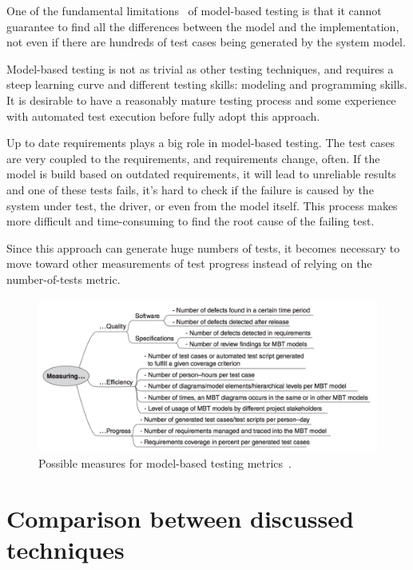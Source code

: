 One of the fundamental limitations~\cite{1200168} of model-based testing is that it cannot guarantee to find all the differences between the model and the implementation, not even if there are hundreds of test cases being generated by the system model.

Model-based testing is not as trivial as other testing techniques, and requires a steep learning curve and different testing skills: modeling and programming skills. It is desirable to have a reasonably mature testing process and some experience with automated test execution before fully adopt this approach.

Up to date requirements plays a big role in model-based testing. The test cases are very coupled to the requirements, and requirements change, often. If the model is build based on outdated requirements, it will lead to unreliable results and one of these tests fails, it's hard to check if the failure is caused by the system under test, the driver, or even from the model itself. This process makes more difficult and time-consuming to find the root cause of the failing test.

\newpage
Since this approach can generate huge numbers of tests, it becomes necessary to move toward other measurements of test progress instead of relying on the number-of-tests metric.

\begin{figure}[!htb]
\centering
\includegraphics[scale=0.5]{metrics.png}
\caption{Possible measures for model-based testing metrics~\cite{Kramer2016}.} \label{fig:metrics}
\end{figure}

\section{Comparison between discussed techniques}

